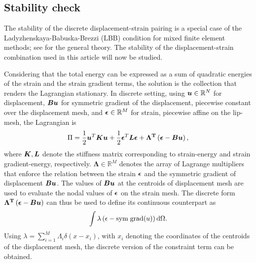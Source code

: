 \documentclass[10pt,review]{cas-sc}
\begin{document}
\subsection{Stability check \label{stab_check_lip_disp}}
The stability of the discrete displacement-strain pairing is a special case of the Ladyzhenskaya-Babuska-Brezzi (LBB) condition for mixed finite element methods; see \cite{auricchio2017mixed} for the general theory. The stability of the displacement-strain combination used in this article will now be studied.

Considering that the total energy can be expressed as a sum of quadratic energies of the strain and the strain gradient terms, the solution is the collection that renders the Lagrangian stationary. In discrete setting, using $\mbox{\boldmath $u$} \in \mathbb{R} ^N$ for displacement, $\mbox{\boldmath $B$} \mbox{\boldmath $u$}$ for symmetric gradient of the displacement, piecewise constant over the displacement mesh, and $\mbox{\boldmath $\epsilon$} \in \mathbb{R}^M$ for strain, piecewise affine on the lip-mesh, the Lagrangian is
\begin{equation}
	\Pi = \frac{1}{2} \mbox{\boldmath $u$} ^T \mbox{\boldmath $K$} \mbox{\boldmath $u$} + \frac{1}{2} \mbox{\boldmath $\epsilon$} ^T \mbox{\boldmath $L$} \mbox{\boldmath $\epsilon$} + \bf \Lambda ^T \left(\mbox{\boldmath $\epsilon$} - \mbox{\boldmath $B$} \mbox{\boldmath $u$} \right),
\end{equation}
where $\mbox{\boldmath $K$},\mbox{\boldmath $L$} $ denote the stiffness matrix corresponding to strain-energy and strain gradient-energy, respectively. $\mathbf{\Lambda} \in \mathbb{R}^M$ denotes the array of Lagrange multipliers that enforce the relation between the strain $\mbox{\boldmath $\epsilon$}$ and the symmetric gradient of displacement $\mbox{\boldmath $B$} \mbox{\boldmath $u$}$. The values of $\mbox{\boldmath $B$} \mbox{\boldmath $u$}$ at the centroids of displacement mesh are used to evaluate the nodal values of $\mbox{\boldmath $\epsilon$} $ on the strain mesh. The discrete form $\bf \Lambda ^T \left(\mbox{\boldmath $\epsilon$} - \mbox{\boldmath $B$} \mbox{\boldmath $u$} \right)$ can thus be used to define its continuous counterpart as
\begin{equation}
	\int \lambda \left( {\epsilon} - {\rm sym \; grad}(u) \right) \mathop{}\!\mathrm{d} \Omega.
\end{equation}
Using $\lambda = \sum_{i=1}^{M} \Lambda_i \delta (x-x_i) $, with $x_i$ denoting the coordinates of the centroids of the displacement mesh, the discrete version of the constraint term can be obtained.
\end{document}
